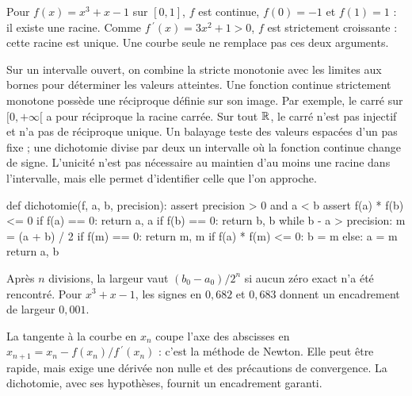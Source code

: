 \begin{savoirfaire}
Pour $f(x)=x^3+x-1$ sur $[0,1]$, $f$ est continue, $f(0)=-1$ et $f(1)=1$ : il existe une racine.
Comme $f\,\!^{\prime}(x)=3x^2+1>0$, $f$ est strictement croissante : cette racine est unique.
Une courbe seule ne remplace pas ces deux arguments.
\end{savoirfaire}
Sur un intervalle ouvert, on combine la stricte monotonie avec les limites aux bornes pour déterminer les valeurs atteintes.
Une fonction continue strictement monotone possède une réciproque définie sur son image. Par exemple, le carré sur $[0,+\infty[$ a pour réciproque la racine carrée. Sur tout $\mathbb{R}$, le carré n'est pas injectif et n'a pas de réciproque unique.
Un balayage teste des valeurs espacées d'un pas fixe ; une dichotomie divise par deux un intervalle où la fonction continue change de signe. L'unicité n'est pas nécessaire au maintien d'au moins une racine dans l'intervalle, mais elle permet d'identifier celle que l'on approche.
\begin{python}
def dichotomie(f, a, b, precision):
    assert precision > 0 and a < b
    assert f(a) * f(b) <= 0
    if f(a) == 0: return a, a
    if f(b) == 0: return b, b
    while b - a > precision:
        m = (a + b) / 2
        if f(m) == 0: return m, m
        if f(a) * f(m) <= 0:
            b = m
        else:
            a = m
    return a, b
\end{python}
Après $n$ divisions, la largeur vaut $(b_0-a_0)/2^n$ si aucun zéro exact n'a été rencontré.
Pour $x^3+x-1$, les signes en $0{,}682$ et $0{,}683$ donnent un encadrement de largeur $0{,}001$.
\begin{exemple}
La tangente à la courbe en $x_n$ coupe l'axe des abscisses en $x_{n+1}=x_n-f(x_n)/f\,\!^{\prime}(x_n)$ : c'est la méthode de Newton. Elle peut être rapide, mais exige une dérivée non nulle et des précautions de convergence. La dichotomie, avec ses hypothèses, fournit un encadrement garanti.
\end{exemple}

